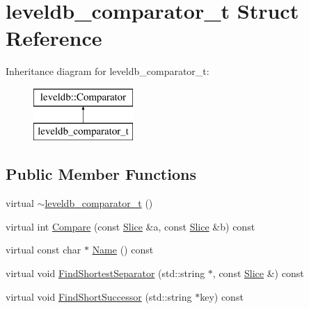 \hypertarget{structleveldb__comparator__t}{}\section{leveldb\+\_\+comparator\+\_\+t Struct Reference}
\label{structleveldb__comparator__t}
Inheritance diagram for leveldb\+\_\+comparator\+\_\+t\+:\begin{figure}[H]
\begin{center}
\leavevmode
\includegraphics[height=2.000000cm]{structleveldb__comparator__t}
\end{center}
\end{figure}
\subsection*{Public Member Functions}
\begin{DoxyCompactItemize}
\item 
virtual \hyperlink{structleveldb__comparator__t_a6717afb2ab1eebb8402b63f00a6d1c35}{$\sim$leveldb\+\_\+comparator\+\_\+t} ()
\item 
virtual int \hyperlink{structleveldb__comparator__t_af340b22c2639696019e13c7bd153d189}{Compare} (const \hyperlink{classleveldb_1_1_slice}{Slice} \&a, const \hyperlink{classleveldb_1_1_slice}{Slice} \&b) const 
\item 
virtual const char $\ast$ \hyperlink{structleveldb__comparator__t_a3b408bc62e1033237b0ef68cfeac7741}{Name} () const 
\item 
virtual void \hyperlink{structleveldb__comparator__t_abbcfac3b28ea84a6ea347be48e1af2f8}{Find\+Shortest\+Separator} (std\+::string $\ast$, const \hyperlink{classleveldb_1_1_slice}{Slice} \&) const 
\item 
virtual void \hyperlink{structleveldb__comparator__t_ad84aa86465a71203cdfd7cac02d85054}{Find\+Short\+Successor} (std\+::string $\ast$key) const 
\end{DoxyCompactItemize}

